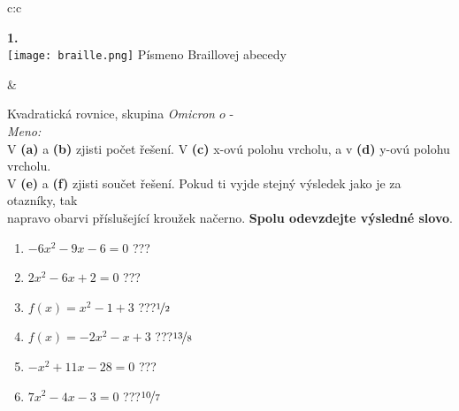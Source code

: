 \documentclass[10pt]{report}
\newcommand\omicron{o}
\begin{document}
\begin{tabular}{c:c}
\begin{minipage}[c][99mm][t]{0.49\linewidth}
\begin{center}
\begin{minipage}{0.20\linewidth}
\begin{center}
{\Huge\bfseries 1.} \\[2mm]
\texttt{[image: braille.png]}
{\small Písmeno Braillovej abecedy}
\end{center}
\end{minipage}
\end{center}
\end{minipage}
&
\begin{minipage}[c][99mm][t]{0.49\linewidth}
\begin{center}
\vspace{7mm}
{\huge Kvadratická rovnice, skupina \textit{Omicron $\omicron$} -}\\[4.5mm]
\textit{Meno:}\phantom{xxxxxxxxxxxxxxxxxxxxxxxxxxxxxxxxxxxxxxxxxxxxxxxxxxxxxxxxxxxxxxxxx}\\[3.5mm]
V \textbf{(a)} a \textbf{(b)} zjisti počet řešení. V \textbf{(c)} x-ovú polohu vrcholu, a v \textbf{(d)} y-ovú polohu vrcholu.\\V \textbf{(e)} a \textbf{(f)} zjisti součet řešení. Pokud ti vyjde stejný výsledek jako je za otazníky, tak\\napravo obarvi příslušející kroužek načerno. \textbf{Spolu odevzdejte výsledné slovo}.\\[3mm]
\begin{minipage}{0.77\linewidth}
\begin{center}
\begin{varwidth}{\textwidth}
\begin{enumerate}
\large
\item $-6x^2-9x-6=0$\quad \dotfill\; ???\;\dotfill {}
\item $2x^2-6x+2=0$\quad \dotfill\; ???\;\dotfill {}
\item $f(x)=x^2-1+3$\quad \dotfill\; ???\;\dotfill \quad $\nicefrac{1}{2}$
\item $f(x)=-2x^2-x+3$\quad \dotfill\; ???\;\dotfill \quad $\nicefrac{13}{8}$
\item $-x^2+11x-28=0$\quad \dotfill\; ???\;\dotfill {}
\item $7x^2-4x-3=0$\quad \dotfill\; ???\;\dotfill \quad $\nicefrac{10}{7}$
\end{enumerate}
\end{varwidth}
\end{center}
\end{minipage}
\begin{minipage}{0.20\linewidth}

\end{minipage}
\end{center}
\end{minipage}
\end{tabular}
\end{document}
